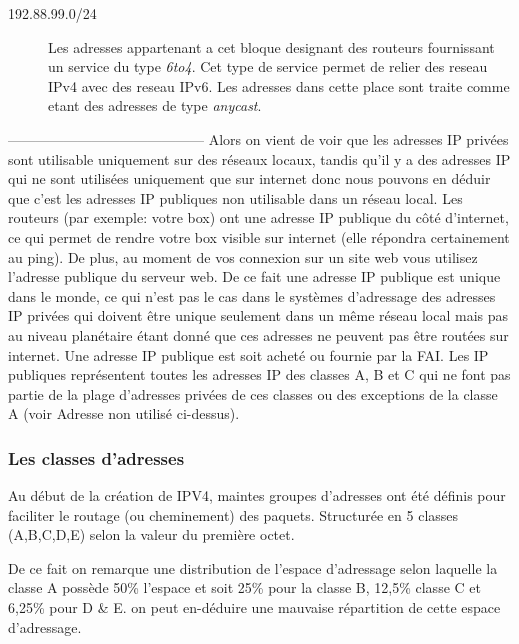 \begin{description}
\item[192.88.99.0/24]
Les adresses appartenant a cet bloque designant des routeurs 
fournissant un service du type {\it 6to4}. Cet type de service
permet de relier des reseau IPv4 avec des reseau IPv6.
Les adresses dans cette place sont traite comme etant des adresses
de type {\it anycast}.


\end{description}




------------------------------------------
Alors on vient de voir que les adresses IP privées sont utilisable uniquement
sur des réseaux locaux, tandis qu’il y a des adresses IP qui ne sont utilisées
uniquement que sur internet donc nous pouvons en déduir que c’est les adresses
IP publiques non utilisable dans un réseau local. Les routeurs (par exemple:
votre box) ont une adresse IP publique du côté d’internet, ce qui permet de
rendre votre box visible sur internet (elle répondra certainement au ping). De
plus, au moment de vos connexion sur un site web vous utilisez l’adresse
publique du serveur web. De ce fait une adresse IP publique est unique dans le
monde, ce qui n’est pas le cas dans le systèmes d’adressage des adresses IP
privées qui doivent être unique seulement dans un même réseau local mais pas au
niveau planétaire étant donné que ces adresses ne peuvent pas être routées sur
internet. Une adresse IP publique est soit acheté ou fournie par la FAI.  Les
IP publiques représentent toutes les adresses IP des classes A, B et C qui ne
font pas partie de la plage d’adresses privées de ces classes ou des exceptions
de la classe A (voir Adresse non utilisé ci-dessus).


\subsubsection{Les classes d’adresses}
Au début de la création de IPV4, maintes groupes d’adresses ont été définis
pour faciliter le routage (ou cheminement) des paquets. Structurée en 5 classes
(A,B,C,D,E) selon la valeur du première octet.


De ce fait on remarque une distribution de l’espace d’adressage selon laquelle
la classe A possède 50\% l’espace et soit 25\% pour la classe B, 12,5\% classe
C et 6,25\% pour D \& E. on peut en-déduire une mauvaise répartition de cette
espace d’adressage. 

